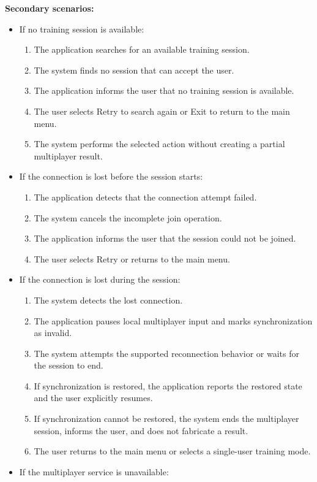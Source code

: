 \documentclass[12pt]{article}
\begin{document}
\begin{description}
\textbf{Secondary scenarios:}
\begin{itemize}
\item If no training session is available:
\begin{enumerate}
\item The application searches for an available training session.
\item The system finds no session that can accept the user.
\item The application informs the user that no training session is available.
\item The user selects Retry to search again or Exit to return to the main
menu.
\item The system performs the selected action without creating a partial
multiplayer result.
\end{enumerate}
\item If the connection is lost before the session starts:
\begin{enumerate}
\item The application detects that the connection attempt failed.
\item The system cancels the incomplete join operation.
\item The application informs the user that the session could not be joined.
\item The user selects Retry or returns to the main menu.
\end{enumerate}
\item If the connection is lost during the session:
\begin{enumerate}
\item The system detects the lost connection.
\item The application pauses local multiplayer input and marks synchronization as
invalid.
\item The system attempts the supported reconnection behavior or waits for the
session to end.
\item If synchronization is restored, the application reports the restored state and the
user explicitly resumes.
\item If synchronization cannot be restored, the system ends the multiplayer
session, informs the user, and does not fabricate a result.
\item The user returns to the main menu or selects a single-user training
mode.
\end{enumerate}
\item If the multiplayer service is unavailable:
\begin{enumerate}

\end{enumerate}
\end{itemize}
\end{description}
\end{document}
